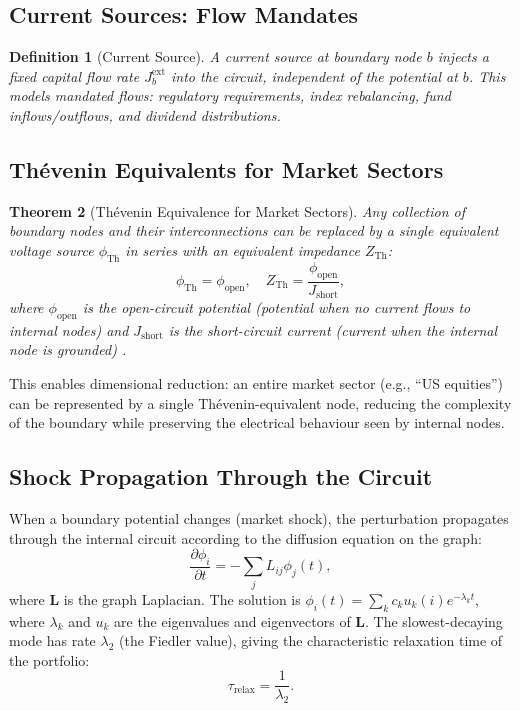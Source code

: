 \documentclass[twocolumn,10pt]{article}
\newtheorem{theorem}{Theorem}[section]
\newtheorem{definition}[theorem]{Definition}
\theoremstyle{remark}
\begin{document}
\subsection{Current Sources: Flow Mandates}

\begin{definition}[Current Source]
\label{def:current_source}
A \emph{current source} at boundary node $b$ injects a fixed capital flow rate $J_b^{\text{ext}}$ into the circuit, independent of the potential at $b$.  This models mandated flows: regulatory requirements, index rebalancing, fund inflows/outflows, and dividend distributions.
\end{definition}

\subsection{Th\'{e}venin Equivalents for Market Sectors}

\begin{theorem}[Th\'{e}venin Equivalence for Market Sectors]
\label{thm:thevenin}
Any collection of boundary nodes and their interconnections can be replaced by a single equivalent voltage source $\phi_{\text{Th}}$ in series with an equivalent impedance $Z_{\text{Th}}$:
\begin{equation}
    \phi_{\text{Th}} = \phi_{\text{open}}, \quad Z_{\text{Th}} = \frac{\phi_{\text{open}}}{J_{\text{short}}},
    \label{eq:thevenin}
\end{equation}
where $\phi_{\text{open}}$ is the open-circuit potential (potential when no current flows to internal nodes) and $J_{\text{short}}$ is the short-circuit current (current when the internal node is grounded) \cite{thevenin1883}.
\end{theorem}

This enables dimensional reduction: an entire market sector (e.g., ``US equities'') can be represented by a single Th\'{e}venin-equivalent node, reducing the complexity of the boundary while preserving the electrical behaviour seen by internal nodes.

\subsection{Shock Propagation Through the Circuit}

When a boundary potential changes (market shock), the perturbation propagates through the internal circuit according to the diffusion equation on the graph:
\begin{equation}
    \frac{\partial \phi_i}{\partial t} = -\sum_{j} L_{ij} \phi_j(t),
    \label{eq:diffusion}
\end{equation}
where $\mathbf{L}$ is the graph Laplacian.  The solution is $\phi_i(t) = \sum_k c_k u_k(i) e^{-\lambda_k t}$, where $\lambda_k$ and $u_k$ are the eigenvalues and eigenvectors of $\mathbf{L}$.  The slowest-decaying mode has rate $\lambda_2$ (the Fiedler value), giving the characteristic relaxation time of the portfolio:
\begin{equation}
    \tau_{\text{relax}} = \frac{1}{\lambda_2}.
    \label{eq:relaxation}
\end{equation}
\end{document}
